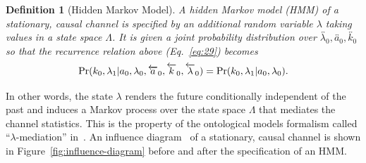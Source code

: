 \documentclass[%
 reprint,
superscriptaddress,
nofootinbib,
 amsmath,amssymb,
 prx, 
 accepted=2019-09-27,
]{quantumarticle}
\newtheorem{definition}{Definition}
\newcommand{\olra}{\overleftrightarrow}
\newcommand{\ola}{\overleftarrow}
\renewcommand{\Pr}{\textup{Pr}}
\begin{document}
\begin{definition}[Hidden Markov Model]
  \label{def:hmm}
  A \emph{hidden Markov model} (HMM) of a stationary, causal channel
  is specified by an additional random variable $\lambda$ taking
  values in a state space $\Lambda$. It is given a joint probability
  distribution over $\olra{\lambda_0},\olra{a_0},\olra{k_0}$ so that
  the recurrence relation above (Eq.~\ref{eq:29}) becomes
\begin{equation}
  \label{eq:30}
  \Pr(k_0,\lambda_1|a_0,\lambda_0,\ola a_0, \ola k_0,\ola \lambda_0)
  =\Pr(k_0,\lambda_1|a_0,\lambda_0).
\end{equation}
\end{definition}
In other words, the state $\lambda$ renders the future conditionally
independent of the past and induces a Markov process over the state
space $\Lambda$ that mediates the channel statistics. This is the
property of the ontological models formalism called
``$\lambda$-mediation''
in~\cite{Leifertimesymmetricinterpretation2017}. An influence
diagram~\cite{HowardInfluenceDiagrams2005} of a stationary, causal
channel is shown in Figure~\ref{fig:influence-diagram} before and
after the specification of an HMM.
\end{document}
